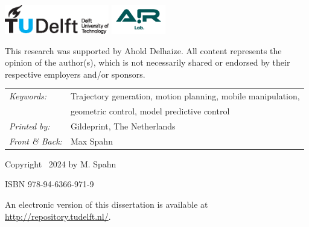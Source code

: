 \begin{titlepage}
\begin{tabular}{p{4cm}l}
\end{tabular}

\vfill
\begin{center}
    \includegraphics[height=0.5in]{logos/tudelft}
    \hspace{2em}
    \includegraphics[height=0.5in]{logos/airlab.png} \\
\end{center}
\vfill

This research was supported by Ahold Delhaize. All content represents the opinion
of the author(s), which is not necessarily shared or endorsed by their respective
employers and/or sponsors.

\noindent
\begin{tabular}{l l}
    \textit{Keywords:} & Trajectory generation, motion
    planning, mobile manipulation, \\
    & geometric control, model
    predictive control\\[\medskipamount]
    \textit{Printed by:} & Gildeprint, The Netherlands \\[\medskipamount]
    \textit{Front \& Back:} & Max Spahn
\end{tabular}

\vspace{4\bigskipamount}

\noindent Copyright \textcopyright\ 2024 by M. Spahn

\medskip
\noindent ISBN 978-94-6366-971-9

\medskip
\noindent An electronic version of this dissertation is available at \\
\url{http://repository.tudelft.nl/}.

\end{titlepage}

